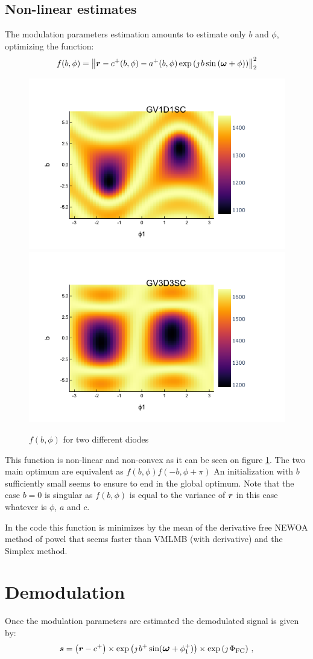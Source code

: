 \documentclass[a4paper,11pt,twoside]{scrartcl}
\begin{document}
\subsection{Non-linear estimates}
The modulation parameters estimation amounts to estimate only $b$  and $\phi$, optimizing the function:
\begin{equation}
   f(b,\phi) = \left\Vert \boldsymbol{r} -  c^+(b,\phi) - a^+(b,\phi) \exp\left( \jmath \, b \sin\left( \boldsymbol{\omega} + \phi\right)\right) \right\Vert_2^2\label{eq:nl}
\end{equation}
\begin{figure}
    \centering
    \includegraphics[width=0.45\linewidth]{figs/GV1D1SC.png}
    \includegraphics[width=0.45\linewidth]{figs/GV3D3SC.png}
    \caption{$f(b,\phi)$ for two different diodes}
    \label{fig:GV1D1SC}
\end{figure}

This function is non-linear and non-convex as it can be seen on figure \ref{fig:GV1D1SC}. The two main optimum are equivalent as $f(b,\phi) f(-b,\phi+ \pi )$ An initialization with $b$ sufficiently small seems to ensure to end in the global optimum. Note that the case $b=0$ is singular  as $f(b,\phi)$ is equal to the variance of $\boldsymbol{r}$ in this case whatever is $\phi$, $a$ and $ c$.

In the code this function is minimizes by the mean of the derivative free NEWOA method of powel that seems faster than VMLMB (with derivative) and  the Simplex method.
\section{Demodulation}
Once the modulation parameters are estimated the demodulated signal is given by:
\begin{equation}
\boldsymbol{s} =\left(\boldsymbol{r} - c^+\right)\times\exp\left( \jmath \, b^+ \sin\large( \boldsymbol{\omega} + \phi^+_1\large)\right)\times\exp\left(\jmath\,\Phi_\textrm{FC}\right)\,,\label{eq:demodulation}
\end{equation}
\end{document}
